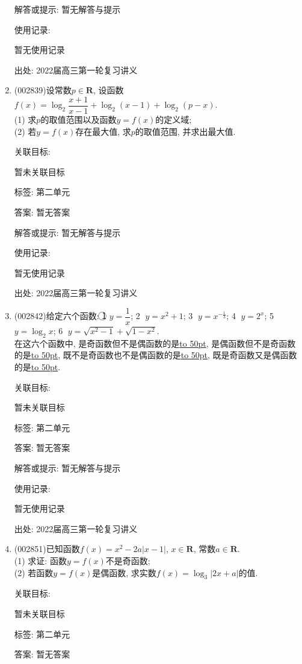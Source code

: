 \documentclass[10pt,a4paper]{article}
\newcommand{\blank}[1]{\underline{\hbox to #1pt{}}}
\begin{document}
\begin{enumerate}[1.]
解答或提示: 暂无解答与提示

使用记录:

暂无使用记录


出处: 2022届高三第一轮复习讲义
\item { (002839)}设常数$p\in \mathbf{R}$, 设函数$f(x)=\log_2\dfrac{x+1}{x-1}+\log_2(x-1)+\log_2(p-x)$.\\
(1) 求$p$的取值范围以及函数$y=f(x)$的定义域;\\
(2) 若$y=f(x)$存在最大值, 求$p$的取值范围, 并求出最大值.


关联目标:

暂未关联目标



标签: 第二单元

答案: 暂无答案

解答或提示: 暂无解答与提示

使用记录:

暂无使用记录


出处: 2022届高三第一轮复习讲义
\item { (002842)}给定六个函数: \textcircled{1} $y=\dfrac 1x$; \textcircled{2} $y=x^2+1$; \textcircled{3} $y={x^{-\frac 13}}$; \textcircled{4} $y=2^x$; \textcircled{5} $y=\log_2x$; \textcircled{6} $y=\sqrt{x^2-1}+\sqrt{1-x^2}$.\\
在这六个函数中, 是奇函数但不是偶函数的是\blank{50}, 是偶函数但不是奇函数的是\blank{50}, 既不是奇函数也不是偶函数的是\blank{50}, 既是奇函数又是偶函数的是\blank{50}.


关联目标:

暂未关联目标



标签: 第二单元

答案: 暂无答案

解答或提示: 暂无解答与提示

使用记录:

暂无使用记录


出处: 2022届高三第一轮复习讲义
\item { (002851)}已知函数$f(x)=x^2-2a|x-1|$, $x\in \mathbf{R}$, 常数$a\in \mathbf{R}$.\\
(1) 求证: 函数$y=f(x)$不是奇函数;\\
(2) 若函数$y=f(x)$是偶函数, 求实数$f(x)=\log_3| 2x+a |$的值.


关联目标:

暂未关联目标



标签: 第二单元

答案: 暂无答案


\end{enumerate}
\end{document}
